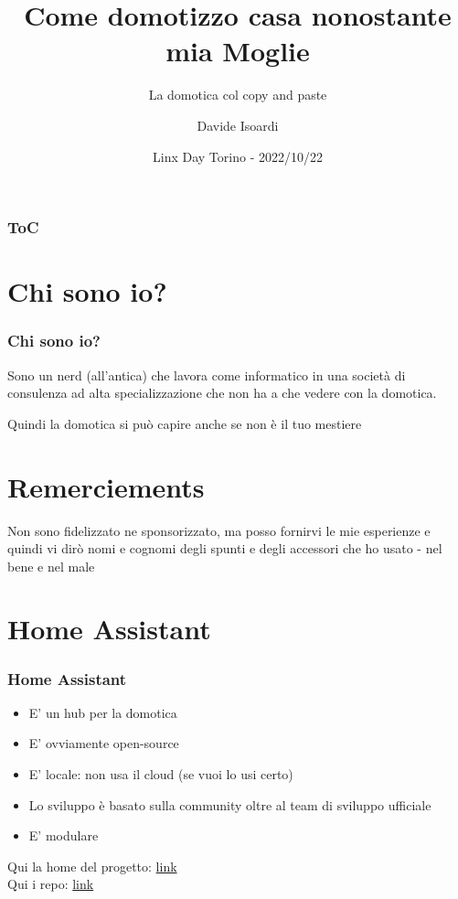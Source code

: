 \documentclass[hyperref={pdfpagelabels=false}]{beamer}
\title{Come domotizzo casa nonostante mia Moglie}
\subtitle{La domotica col copy and paste}
\author{Davide Isoardi}
\date{Linx Day Torino - 2022/10/22}
\newif\ifshowtoc
\begin{document}
	\begin{frame}
		\titlepage
	\end{frame} 
	
	
	\begin{frame}
		\frametitle{ToC}
		\tableofcontents[hidesubsections]
	\end{frame} 
	
	
	\section{Chi sono io?} 
	\begin{frame}
		\frametitle{Chi sono io?} 
		Sono un nerd (all'antica) che lavora come informatico in una società di consulenza ad alta specializzazione che non ha a che vedere con la domotica.
		
		Quindi la domotica si può capire anche se non è il tuo mestiere
	\end{frame}
	\showtocfalse%
	\section*{Remerciements}
	\begin{frame}
		\begin{block}{Non sono fidelizzato ne sponsorizzato, ma posso fornirvi le mie esperienze e quindi vi dirò nomi e cognomi degli spunti e degli accessori che ho usato - nel bene e nel male}
		\end{block}
	\end{frame}
	\section{Home Assistant}
	\begin{frame}
		\frametitle{Home Assistant}
		\begin{itemize}
			\item E' un hub per la domotica
			\item E' ovviamente open-source
			\item E' locale: non usa il cloud (se vuoi lo usi certo)
			\item Lo sviluppo è basato sulla community oltre al team di sviluppo ufficiale
			\item E' modulare
		\end{itemize}
		\medskip
		\normalsize Qui la home del progetto: \href{https://www.home-assistant.io/}{link}\\	\normalsize Qui i repo: \href{https://github.com/home-assistant}{link}
	\end{frame}
	
\end{document}

